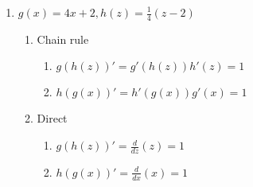 \documentclass[12pt]{article}
\begin{document}
\begin{enumerate}
    \item $g(x) = 4x+2, h(z) = \frac{1}{4}(z-2)$
    \begin{enumerate}
         \item Chain rule
         \begin{enumerate}
            \item $g(h(z))' = g'(h(z))h'(z) = 1$
            \item $h(g(x))' = h'(g(x))g'(x) = 1$
        \end{enumerate}
         \item Direct
         \begin{enumerate}
            \item $g(h(z))' = \frac{d}{dz}(z) =1$
            \item $h(g(x))' = \frac{d}{dx}(x)=1$
        \end{enumerate}
     \end{enumerate}
\end{enumerate}
\end{document}
